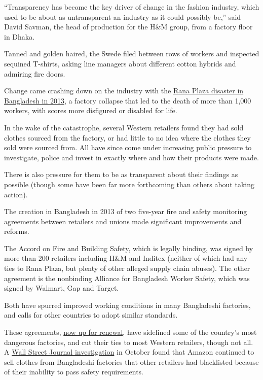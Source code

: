 ``Transparency has become the key driver of change in the fashion
industry, which used to be about as untransparent an industry as it
could possibly be,'' said David Savman, the head of production for the
H\&M group, from a factory floor in Dhaka.

Tanned and golden haired, the Swede filed between rows of workers and
inspected sequined T-shirts, asking line managers about different cotton
hybrids and admiring fire doors.

Change came crashing down on the industry with the
\href{https://www.nytimes3xbfgragh.onion/2015/06/02/world/asia/bangladesh-rana-plaza-murder-charges.html}{Rana
Plaza disaster in Bangladesh in 2013}, a factory collapse that led to
the death of more than 1,000 workers, with scores more disfigured or
disabled for life.

In the wake of the catastrophe, several Western retailers found they had
sold clothes sourced from the factory, or had little to no idea where
the clothes they sold were sourced from. All have since come under
increasing public pressure to investigate, police and invest in exactly
where and how their products were made.

There is also pressure for them to be as transparent about their
findings as possible (though some have been far more forthcoming than
others about taking action).

The creation in Bangladesh in 2013 of two five-year fire and safety
monitoring agreements between retailers and unions made significant
improvements and reforms.

The Accord on Fire and Building Safety, which is legally binding, was
signed by more than 200 retailers including H\&M and Inditex (neither of
which had any ties to Rana Plaza, but plenty of other alleged supply
chain abuses). The other agreement is the nonbinding Alliance for
Bangladesh Worker Safety, which was signed by Walmart, Gap and Target.

Both have spurred improved working conditions in many Bangladeshi
factories, and calls for other countries to adopt similar standards.

These agreements,
\href{https://cleanclothes.org/news/2019/questions-raised-after-agreement-reached-on-bangladesh-accord}{now
up for renewal}, have sidelined some of the country's most dangerous
factories, and cut their ties to most Western retailers, though not all.
A
\href{https://www.wsj.com/video/unsafe-factories-in-bangladesh-are-supplying-amazon-sellers/120C9E33-4C91-43D9-AE28-47B42DF47405.html}{Wall
Street Journal investigation} in October found that Amazon continued to
sell clothes from Bangladeshi factories that other retailers had
blacklisted because of their inability to pass safety requirements.

